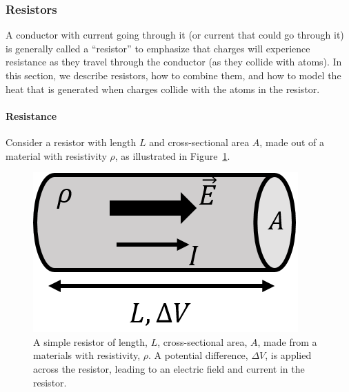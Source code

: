 \subsubsection{Resistors}

A conductor with current going through it (or current that could go through it) is generally called a ``resistor'' to emphasize that charges will experience resistance as they travel through the conductor (as they collide with atoms). In this section, we describe resistors, how to combine them, and how to model the heat that is generated when charges collide with the atoms in the resistor.

\paragraph{Resistance}

Consider a resistor with length $L$ and cross-sectional area $A$, made out of a material with resistivity $\rho$, as illustrated in Figure~\ref{fig:current:resistor}.

\begin{figure}[!htbp]
\centering
\includegraphics[width=0.3\linewidth]{files/resistor-19789ed5da193d469511eec922645ce0.png}
\caption[]{A simple resistor of length, $L$, cross-sectional area, $A$, made from a materials with resistivity, $\rho$. A potential difference, $\Delta V$, is applied across the resistor, leading to an electric field and current in the resistor.}
\label{fig:current:resistor}
\end{figure}

